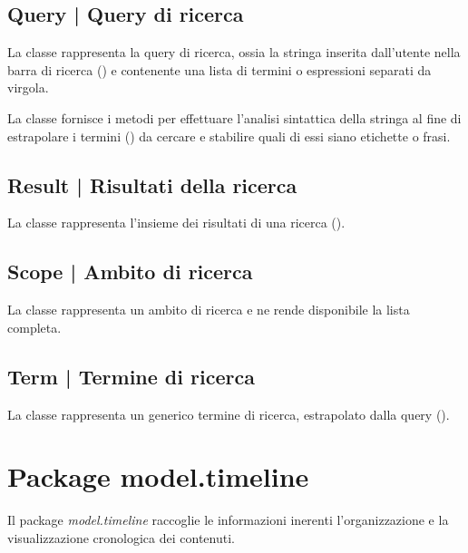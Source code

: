 \documentclass[10pt,a4paper,headinclude,footinclude,hidelinks]{scrreprt} %
\begin{document}
	\subsection[Query]{Query | Query di ricerca}
	\label{sec:stage:design:sistema:model.search:search-query}
	La classe \textit{} rappresenta la query di ricerca, ossia la stringa inserita dall'utente nella barra di ricerca (\textit{}) e contenente una lista di termini o espressioni separati da virgola.

	La classe fornisce i metodi per effettuare l'analisi sintattica della stringa al fine di estrapolare i termini (\textit{}) da cercare e stabilire quali di essi siano etichette o frasi.

	\subsection[Result]{Result | Risultati della ricerca}
	\label{sec:stage:design:sistema:model.search:search-result}
	La classe \textit{} rappresenta l'insieme dei risultati di una ricerca (\textit{}).

	\subsection[Scope]{Scope | Ambito di ricerca}
	\label{sec:stage:design:sistema:model.search:search-scope}
	La classe \textit{} rappresenta un ambito di ricerca e ne rende disponibile la lista completa.

	\subsection[Term]{Term | Termine di ricerca}
	\label{sec:stage:design:sistema:model.search:search-term}
	La classe \textit{} rappresenta un generico termine di ricerca, estrapolato dalla query (\textit{}).

	\section{Package model.timeline}
	\label{sec:stage:design:sistema:model.timeline}
	Il package \textit{model.timeline} raccoglie le informazioni inerenti l'organizzazione e la visualizzazione cronologica dei contenuti.
\end{document}
